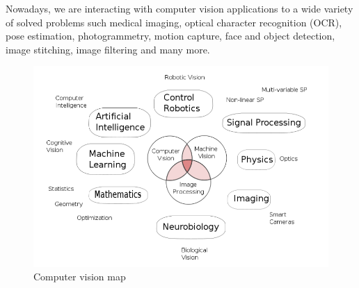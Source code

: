 Nowadays, we are interacting with computer vision applications to a wide variety of solved problems such medical imaging, optical character recognition (OCR), pose estimation, photogrammetry, motion capture, face and object detection, image stitching, image filtering and many more.

\begin{figure}[h!]
    \centering  
    \includegraphics[width=.6\textwidth]{figures/chap3/cv/cv}
    \caption{Computer vision map}
    \label{c3:cv}
\end{figure}

